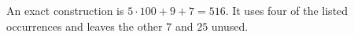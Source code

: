An exact construction is $\boxed{5\cdot100+9+7=516}$. It uses four of the listed occurrences and leaves the other $7$ and $25$ unused.
